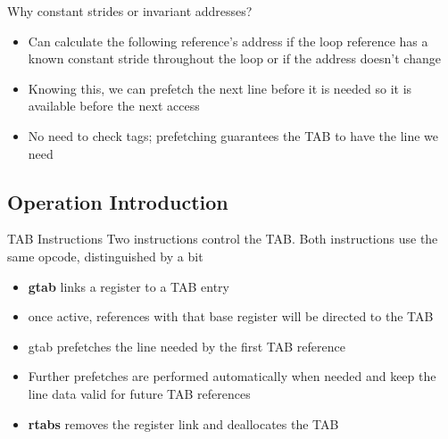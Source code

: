 \documentclass{beamer}
\begin{document}
\begin{frame}{Why constant strides or invariant addresses?}
   \begin{itemize}
      \item Can calculate the following reference's address if the loop reference
         has a known constant stride throughout the loop or if the address 
         doesn't change
      \item Knowing this, we can prefetch the next line before it is needed so
         it is available before the next access
      \item No need to check tags; prefetching guarantees the TAB to have the line 
         we need
   \end{itemize}
\end{frame}
\subsection{Operation Introduction}
\begin{frame}{TAB Instructions}
   Two instructions control the TAB. Both instructions use the same opcode,
   distinguished by a bit
   \begin{itemize}
      \item \textbf{gtab} links a register to a TAB entry
      \item once active, references with that base register will be directed to the TAB
      \item gtab prefetches the line needed by the first TAB reference
      \item Further prefetches are performed automatically when needed and keep
         the line data valid for future TAB references
      \item \textbf{rtabs} removes the register link and deallocates the TAB
   \end{itemize}
\end{frame}
\end{document}
